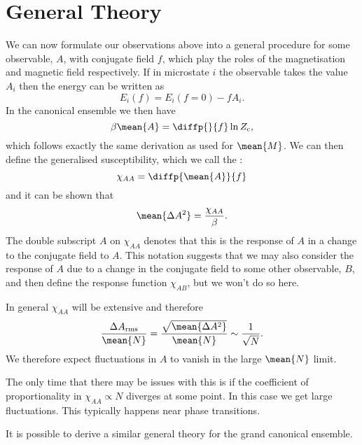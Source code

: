 \documentclass[fleqn]{NotesClass}
\newcommand*{\cpartition}{Z_{\mathrm{c}}}
\begin{document}
    \section{General Theory}
    We can now formulate our observations above into a general procedure for some observable, \(A\), with conjugate field \(f\), which play the roles of the magnetisation and magnetic field respectively.
    If in microstate \(i\) the observable takes the value \(A_i\) then the energy can be written as
    \begin{equation}
        E_i(f) = E_i(f = 0) - fA_i.
    \end{equation}
    In the canonical ensemble we then have
    \begin{equation}
        \beta\mean{A} = \diffp{}{f}\ln \cpartition,
    \end{equation}
    which follows exactly the same derivation as used for \(\mean{M}\).
    We can then define the generalised susceptibility, which we call the :
    \begin{equation}
        \chi_{AA} = \diffp{\mean{A}}{f}
    \end{equation}
    and it can be shown that
    \begin{equation}
        \mean{\Delta A^2} = \frac{\chi_{AA}}{\beta}.
    \end{equation}
    The double subscript \(A\) on \(\chi_{AA}\) denotes that this is the response of \(A\) in a change to the conjugate field to \(A\).
    This notation suggests that we may also consider the response of \(A\) due to a change in the conjugate field to some other observable, \(B\), and then define the response function \(\chi_{AB}\), but we won't do so here.
    
    In general \(\chi_{AA}\) will be extensive and therefore
    \begin{equation}
        \frac{\Delta A_{\mathrm{rms}}}{\mean{N}} = \frac{\sqrt{\mean{\Delta A^2}}}{\mean{N}} \sim \frac{1}{\sqrt{N}}.
    \end{equation}
    We therefore expect fluctuations in \(A\) to vanish in the large \(\mean{N}\) limit.
    
    The only time that there may be issues with this is if the coefficient of proportionality in \(\chi_{AA} \propto N\) diverges at some point.
    In this case we get large fluctuations.
    This typically happens near phase transitions.
    
    It is possible to derive a similar general theory for the grand canonical ensemble.
    
\end{document}
